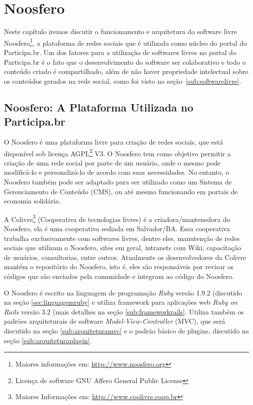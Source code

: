 \chapter{Noosfero}
\label{cap:noosfero}
Neste capítulo iremos discutir o funcionamento e arquitetura do software livre Noosfero\footnote{Maiores informações em: \url{http://www.noosfero.org}}, a plataforma de redes sociais que é utilizada como núcleo do portal do Participa.br. Um dos fatores para a utilização de softwares livres no portal do Participa.br é o fato que o desenvolvimento do software ser colaborativo e todo o conteúdo criado é compartilhado, além de não haver propriedade intelectual sobre os conteúdos gerados na rede social, como foi visto na seção~\ref{sub:softwarelivre}.


\section{Noosfero: A Plataforma Utilizada no Participa.br}
O Noosfero é uma plataforma livre para criação de redes sociais, que está disponível sob licença AGPL\footnote{Licença de software GNU Affero General Public License} V3. O Noosfero tem como objetivo permitir a criação de uma rede social por parte de um usuário, onde o mesmo pode modificá-lo e personalizá-lo de acordo com suas necessidades. No entanto, o Noosfero também pode ser adaptado para ser utilizado como um Sistema de Gerenciamento de Conteúdo (CMS), ou até mesmo funcionando em portais de economia solidária.

A Colivre\footnote{Maiores Informações em: \url{http://www.coolivre.coop.br}} (Cooperativa de tecnologias livres) é a criadora/mantenedora do Noosfero, ela é uma cooperativa sediada em Salvador/BA. Essa cooperativa trabalha exclusivamente com softwares livres, dentre eles, manutenção de redes sociais que utilizam o Noosfero, sites em geral, intranets com Wiki, capacitação de usuários, consultorias, entre outros. Atualmente os desenvolvedores da Colivre mantém o repositório do Noosfero, isto é, eles são responsáveis por revisar os códigos que são enviados pela comunidade e integram ao código do Noosfero.

O Noosfero é escrito na linguagem de programação \textit{Ruby} versão 1.9.2 (discutido na seção \ref{sec:linguagemruby} e utiliza framework para aplicações web \textit{Ruby on Rails} versão 3.2 (mais detalhes na seção \ref{sub:frameworkrails}. Utiliza também os padrões arquiteturais de software \textit{Model-View-Controller} (MVC), que será discutido na seção \ref{sub:arquiteturamvc} e o padrão básico de plugins, discutido na seção \ref{sub:arquiteturaplugin}. 

